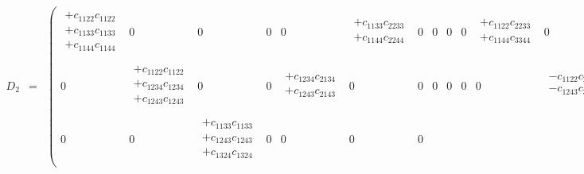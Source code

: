 \begin{eqnarray}
D_2 &=&
\begin{pmatrix}
\begin{array}{l}
+c_{1122}c_{1122} \\
+c_{1133}c_{1133} \\
+c_{1144}c_{1144} \\
\end{array} &
0 &
0 &
0 &
0 &
\begin{array}{l}
+c_{1133}c_{2233} \\
+c_{1144}c_{2244} \\
\end{array} &
0 &
0 &
0 &
0 &
\begin{array}{l}
+c_{1122}c_{2233} \\
+c_{1144}c_{3344} \\
\end{array} &
0 &
0 &
0 &
0 &
\begin{array}{l}
+c_{1122}c_{2244} \\
+c_{1133}c_{3344} \\
\end{array} \\
0 &
\begin{array}{l}
+c_{1122}c_{1122} \\
+c_{1234}c_{1234} \\
+c_{1243}c_{1243} \\
\end{array} &
0 &
0 &
\begin{array}{l}
+c_{1234}c_{2134} \\
+c_{1243}c_{2143} \\
\end{array} &
0 &
0 &
0 &
0 &
0 &
0 &
\begin{array}{l}
-c_{1122}c_{2134} \\
-c_{1243}c_{3344} \\
\end{array} &
0 &
0 &
\begin{array}{l}
-c_{1122}c_{2143} \\
-c_{1234}c_{3344} \\
\end{array} &
0 \\
0 &
0 &
\begin{array}{l}
+c_{1133}c_{1133} \\
+c_{1243}c_{1243} \\
+c_{1324}c_{1324} \\
\end{array} &
0 &
0 &
0 &
0 &

\end{pmatrix}
\end{eqnarray}
